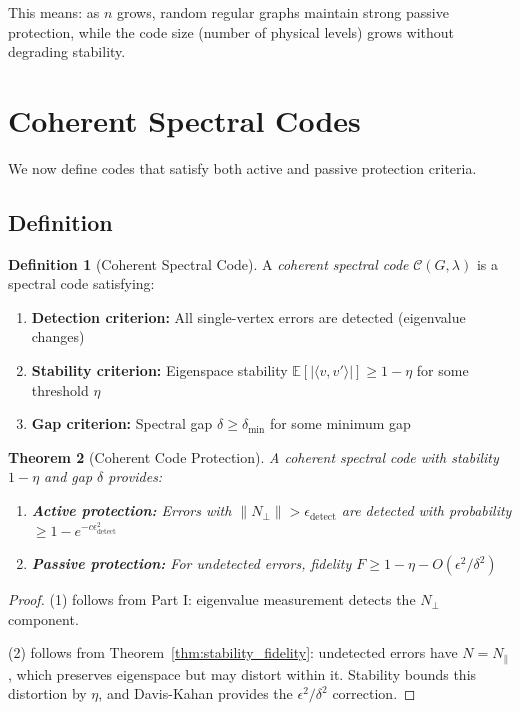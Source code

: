 \documentclass[11pt,a4paper]{article}
\newtheorem{theorem}{Theorem}[section]
\theoremstyle{definition}
\newtheorem{definition}[theorem]{Definition}
\newcommand{\E}{\mathbb{E}}
\newcommand{\codespace}{\mathcal{C}}
\begin{document}
This means: as $n$ grows, random regular graphs maintain strong passive protection, while the code size (number of physical levels) grows without degrading stability.

\section{Coherent Spectral Codes}
\label{sec:coherent}

We now define codes that satisfy both active and passive protection criteria.

\subsection{Definition}

\begin{definition}[Coherent Spectral Code]
\label{def:coherent}
A \emph{coherent spectral code} $\codespace(G, \lambda)$ is a spectral code satisfying:
\begin{enumerate}
    \item \textbf{Detection criterion:} All single-vertex errors are detected (eigenvalue changes)
    \item \textbf{Stability criterion:} Eigenspace stability $\E[|\langle v, v'\rangle|] \geq 1 - \eta$ for some threshold $\eta$
    \item \textbf{Gap criterion:} Spectral gap $\delta \geq \delta_{\min}$ for some minimum gap
\end{enumerate}
\end{definition}

\begin{theorem}[Coherent Code Protection]
\label{thm:coherent_protection}
A coherent spectral code with stability $1-\eta$ and gap $\delta$ provides:
\begin{enumerate}
    \item \textbf{Active protection:} Errors with $\|N_\perp\| > \epsilon_{\text{detect}}$ are detected with probability $\geq 1 - e^{-c\epsilon_{\text{detect}}^2}$
    \item \textbf{Passive protection:} For undetected errors, fidelity $F \geq 1 - \eta - O(\epsilon^2/\delta^2)$
\end{enumerate}
\end{theorem}

\begin{proof}
(1) follows from Part I: eigenvalue measurement detects the $N_\perp$ component.

(2) follows from Theorem~\ref{thm:stability_fidelity}: undetected errors have $N = N_\parallel$, which preserves eigenspace but may distort within it. Stability bounds this distortion by $\eta$, and Davis-Kahan provides the $\epsilon^2/\delta^2$ correction.
\end{proof}
\end{document}
